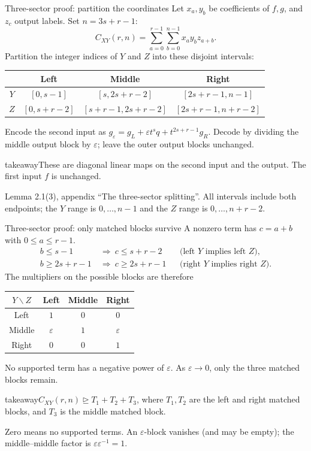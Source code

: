 \documentclass[aspectratio=169,11pt]{beamer}
\newcommand{\degen}{\unrhd}
\newcommand{\source}[1]{\vfill\par{\fontsize{7.5}{9}\selectfont\color{muted}#1\par}}
\newcommand{\takeaway}[1]{\begin{beamercolorbox}[sep=0.65em,wd=\linewidth]{takeaway}#1\end{beamercolorbox}}
\begin{document}
\begin{frame}{Three-sector proof: partition the coordinates}
  Let $x_a,y_b$ be coefficients of $f,g$, and $z_c$ output labels.
  Set $n=3s+r-1$:
  \[
    C_{XY}(r,n)=\sum_{a=0}^{r-1}\sum_{b=0}^{n-1}x_a y_b z_{a+b}.
  \]
  Partition the integer indices of $Y$ and $Z$ into these disjoint intervals:
  \begin{center}
    \renewcommand{\arraystretch}{1.2}
    \begin{tabular}{@{}c|ccc@{}}
       & Left & Middle & Right\\
      \hline
      $Y$ & $[0,s-1]$ & $[s,2s+r-2]$ & $[2s+r-1,n-1]$\\
      $Z$ & $[0,s+r-2]$ & $[s+r-1,2s+r-2]$ & $[2s+r-1,n+r-2]$
    \end{tabular}
  \end{center}
  Encode the second input as
  $g_\varepsilon=g_L+\varepsilon t^s q+t^{2s+r-1}g_R$.
  Decode by dividing the middle output block by $\varepsilon$;
  leave the outer output blocks unchanged.
  \par\smallskip
  \takeaway{These are diagonal linear maps on the second input and the
    output. The first input $f$ is unchanged.}
  \source{Lemma 2.1(3), appendix ``The three-sector splitting''.
  All intervals include both endpoints; the $Y$ range is $0,\ldots,n-1$
  and the $Z$ range is $0,\ldots,n+r-2$.}
\end{frame}

\begin{frame}{Three-sector proof: only matched blocks survive}
  A nonzero term has $c=a+b$ with $0\le a\le r-1$.
  \[
  \begin{aligned}
    b\le s-1&\ \Longrightarrow\ c\le s+r-2
      &&\text{(left $Y$ implies left $Z$)},\\
    b\ge2s+r-1&\ \Longrightarrow\ c\ge2s+r-1
      &&\text{(right $Y$ implies right $Z$)}.
  \end{aligned}
  \]
  The multipliers on the possible blocks are therefore
  \begin{center}
    \renewcommand{\arraystretch}{1.2}
    \begin{tabular}{@{}c|ccc@{}}
      $Y\backslash Z$ & Left & Middle & Right\\
      \hline
      Left & $1$ & $0$ & $0$\\
      Middle & $\varepsilon$ & $1$ & $\varepsilon$\\
      Right & $0$ & $0$ & $1$
    \end{tabular}
  \end{center}
  No supported term has a negative power of $\varepsilon$.
  As $\varepsilon\to0$, only the three matched blocks remain.
  \par\smallskip
  \takeaway{$C_{XY}(r,n)\degen T_1+T_2+T_3$, where $T_1,T_2$ are the
    left and right matched blocks, and $T_3$ is the middle matched block.}
  \source{Zero means no supported terms. An $\varepsilon$-block vanishes
  (and may be empty); the middle--middle factor is
  $\varepsilon\varepsilon^{-1}=1$.}
\end{frame}
\end{document}
